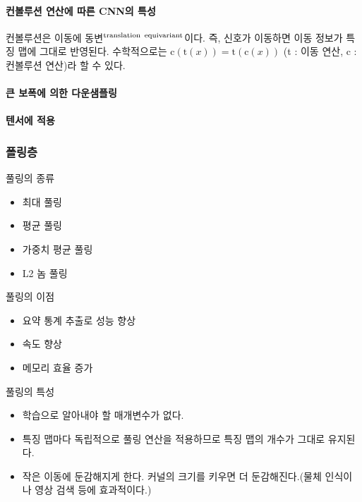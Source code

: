 \documentclass [12pt] {oblivoir}
\let\oldsubsubsection=\subsubsection
\renewcommand{\subsubsection}
{
  \filbreak
  \oldsubsubsection
}
\begin{document}
\vspace{3mm}

\paragraph*{컨볼루션 연산에 따른 CNN의 특성}\mbox{}

\vspace{3mm}

컨볼루션은 이동에 동변$^{\text{translation\, equivariant}}$이다. 즉, 신호가 이동하면 이동 정보가 특징 맵에 그대로 반영된다. 수학적으로는 $\text{c}(\text{t}(x)) = \text{t}(\text{c}(x))$ (t : 이동 연산, c : 컨볼루션 연산)라 할 수 있다.

\paragraph*{큰 보폭에 의한 다운샘플링}\mbox{}

\vspace{3mm}

\paragraph*{텐서에 적용}\mbox{}

\vspace{3mm}

\subsubsection{폴링층}
풀링의 종류
\begin{itemize}
  \item 최대 풀링
  \item 평균 풀링
  \item 가중치 평균 풀링
  \item L2 놈 풀링
\end{itemize}

풀링의 이점
\begin{itemize}
  \item 요약 통계 추출로 성능 향상
  \item 속도 향상
  \item 메모리 효율 증가
\end{itemize}

풀링의 특성
\begin{itemize}
  \item 학습으로 알아내야 할 매개변수가 없다.
  \item 특징 맵마다 독립적으로 풀링 연산을 적용하므로 특징 맵의 개수가 그대로 유지된다.
  \item 작은 이동에 둔감해지게 한다. 커널의 크기를 키우면 더 둔감해진다.(물체 인식이나 영상 검색 등에 효과적이다.)
\end{itemize}
\end{document}
